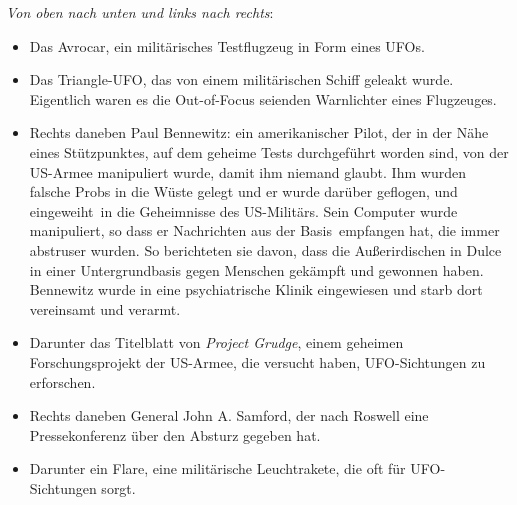 \documentclass{scrartcl}
\begin{document}
\textit{Von oben nach unten und links nach rechts}:

\begin{itemize}
	\item Das Avrocar, ein militärisches Testflugzeug in Form eines UFOs. 
	\item Das Triangle-UFO, das von einem militärischen Schiff geleakt wurde. Eigentlich waren es die Out-of-Focus seienden Warnlichter eines Flugzeuges.
	\item Rechts daneben Paul Bennewitz: ein amerikanischer Pilot, der in der Nähe eines Stützpunktes, auf dem geheime Tests durchgeführt worden sind, von der US-Armee manipuliert wurde, damit ihm niemand glaubt. Ihm wurden falsche Probs in die Wüste gelegt und er wurde darüber geflogen, und \frq eingeweiht\flq\ in die Geheimnisse des US-Militärs. Sein Computer wurde manipuliert, so dass er Nachrichten \frq aus der Basis\flq\ empfangen hat, die immer abstruser wurden. So berichteten sie davon, dass die Außerirdischen in Dulce in einer Untergrundbasis gegen Menschen gekämpft und gewonnen haben. Bennewitz wurde in eine psychiatrische Klinik eingewiesen und starb dort vereinsamt und verarmt.
	\item Darunter das Titelblatt von \textit{Project Grudge}, einem geheimen Forschungsprojekt der US-Armee, die versucht haben, UFO-Sichtungen zu erforschen.
	\item Rechts daneben General John A. Samford, der nach Roswell eine Pressekonferenz über den Absturz gegeben hat.
	\item Darunter ein Flare, eine militärische Leuchtrakete, die oft für UFO-Sichtungen sorgt.
\end{itemize}
\end{document}
